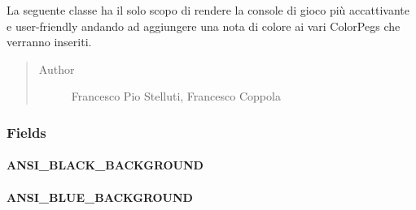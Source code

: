\documentclass[letterpaper,10pt,italian,openany,oneside]{sphinxmanual}
\begin{document}
\begin{fulllineitems}
\label{\detokenize{test/it/unicam/cs/pa/mastermind/ui/AnsiUtility:it.unicam.cs.pa.mastermind.ui.AnsiUtility}}
La seguente classe ha il solo scopo di rendere la console di gioco più accattivante e user-friendly andando ad aggiungere una nota di colore ai vari ColorPegs che verranno inseriti.
\begin{quote}\begin{description}
\item[{Author}] \leavevmode
Francesco Pio Stelluti, Francesco Coppola

\end{description}\end{quote}

\end{fulllineitems}



\subsubsection{Fields}
\label{\detokenize{test/it/unicam/cs/pa/mastermind/ui/AnsiUtility:fields}}

\paragraph{ANSI\_BLACK\_BACKGROUND}
\label{\detokenize{test/it/unicam/cs/pa/mastermind/ui/AnsiUtility:ansi-black-background}}

\begin{fulllineitems}
\label{\detokenize{test/it/unicam/cs/pa/mastermind/ui/AnsiUtility:it.unicam.cs.pa.mastermind.ui.AnsiUtility.ANSI_BLACK_BACKGROUND}}
\end{fulllineitems}



\paragraph{ANSI\_BLUE\_BACKGROUND}
\label{\detokenize{test/it/unicam/cs/pa/mastermind/ui/AnsiUtility:ansi-blue-background}}
\end{document}
